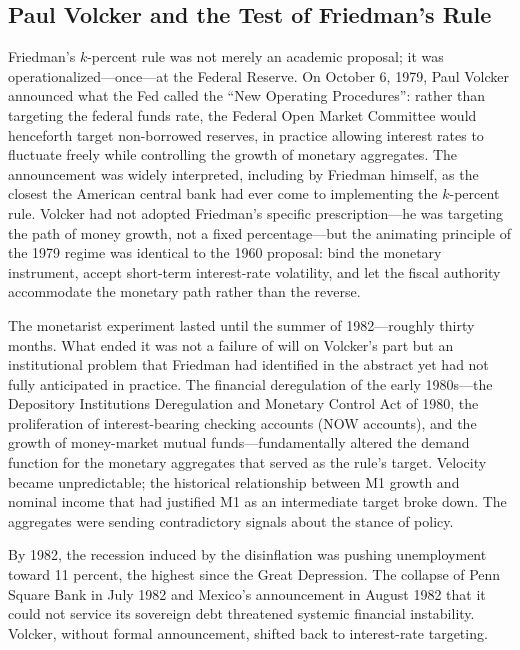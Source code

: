 \documentclass[12pt]{article}
\begin{document}
\subsection{Paul Volcker and the Test of Friedman's Rule}

Friedman's $k$-percent rule was not merely an academic proposal; it was
operationalized---once---at the Federal Reserve.  On October 6, 1979,
Paul Volcker announced what the Fed called the ``New Operating
Procedures'': rather than targeting the federal funds rate, the Federal
Open Market Committee would henceforth target non-borrowed reserves,
in practice allowing interest rates to fluctuate freely while controlling
the growth of monetary aggregates.  The announcement was widely
interpreted, including by Friedman himself, as the closest the American
central bank had ever come to implementing the $k$-percent rule.
Volcker had not adopted Friedman's specific prescription---he was
targeting the path of money growth, not a fixed percentage---but the
animating principle of the 1979 regime was identical to the 1960
proposal: bind the monetary instrument, accept short-term
interest-rate volatility, and let the fiscal authority accommodate the
monetary path rather than the reverse.

The monetarist experiment lasted until the summer of 1982---roughly
thirty months.  What ended it was not a failure of will on Volcker's
part but an institutional problem that Friedman had identified in the
abstract yet had not fully anticipated in practice.  The financial
deregulation of the early 1980s---the Depository Institutions
Deregulation and Monetary Control Act of 1980, the proliferation of
interest-bearing checking accounts (NOW accounts), and the growth of
money-market mutual funds---fundamentally altered the demand function for
the monetary aggregates that served as the rule's target.  Velocity
became unpredictable; the historical relationship between M1 growth and
nominal income that had justified M1 as an intermediate target broke
down.  The aggregates were sending contradictory signals about the stance
of policy.

By 1982, the recession induced by the disinflation was pushing
unemployment toward 11 percent, the highest since the Great Depression.
The collapse of Penn Square Bank in July 1982 and Mexico's announcement
in August 1982 that it could not service its sovereign debt threatened
systemic financial instability.  Volcker, without formal announcement,
shifted back to interest-rate targeting.
\end{document}
